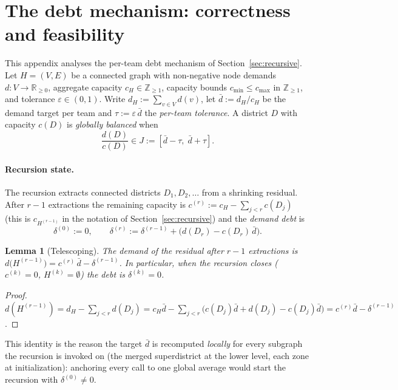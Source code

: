 \documentclass[preprint,12pt,authoryear]{elsarticle}
\newtheorem{lemma}[theorem]{Lemma}
\theoremstyle{definition}
\begin{document}
\section{The debt mechanism: correctness and feasibility}
\label{app:debt}

This appendix analyses the per-team debt mechanism of
Section~\ref{sec:recursive}. Let $H=(V,E)$ be a connected graph with
non-negative node demands $d\colon V\to\mathbb{R}_{\ge 0}$, aggregate
capacity $c_H\in\mathbb{Z}_{\ge 1}$, capacity bounds
$c_{\min}\le c_{\max}$ in $\mathbb{Z}_{\ge 1}$, and tolerance
$\varepsilon\in(0,1)$. Write $d_H:=\sum_{v\in V} d(v)$, let
$\bar d := d_H/c_H$ be the demand target per team and
$\tau := \varepsilon\,\bar d$ the \emph{per-team tolerance}. A district
$D$ with capacity $c(D)$ is \emph{globally balanced} when
\begin{equation}\label{eq:app-global}
  \frac{d(D)}{c(D)} \in J := [\bar d-\tau,\;\bar d+\tau].
\end{equation}

\paragraph{Recursion state.}
The recursion extracts connected districts $D_1,D_2,\ldots$ from a shrinking
residual. After $r-1$ extractions the remaining capacity is
$c^{(r)} := c_H-\sum_{j<r} c(D_j)$ (this is $c_{H^{(r-1)}}$ in the notation of Section~\ref{sec:recursive}) and the \emph{demand debt} is
\begin{equation}\label{eq:app-debt}
  \delta^{(0)} := 0,\qquad
  \delta^{(r)} := \delta^{(r-1)} + \bigl(d(D_r)-c(D_r)\,\bar d\bigr).
\end{equation}

\begin{lemma}[Telescoping]\label{lem:app-telescoping}\label{rem:telescoping}
The demand of the residual after $r-1$ extractions is
$d\bigl(H^{(r-1)}\bigr) = c^{(r)}\,\bar d-\delta^{(r-1)}$. In particular,
when the recursion closes ($c^{(k)}=0$, $H^{(k)}=\emptyset$) the debt is
$\delta^{(k)}=0$.
\end{lemma}
\begin{proof}
$d(H^{(r-1)}) = d_H-\sum_{j<r} d(D_j)
 = c_H\bar d-\sum_{j<r}\bigl(c(D_j)\bar d + d(D_j)-c(D_j)\bar d\bigr)
 = c^{(r)}\bar d-\delta^{(r-1)}$.
\end{proof}

This identity is the reason the target $\bar d$ is recomputed \emph{locally}
for every subgraph the recursion is invoked on (the merged superdistrict at
the lower level, each zone at initialization): anchoring every call to one
global average would start the recursion with $\delta^{(0)}\neq 0$.
\end{document}
